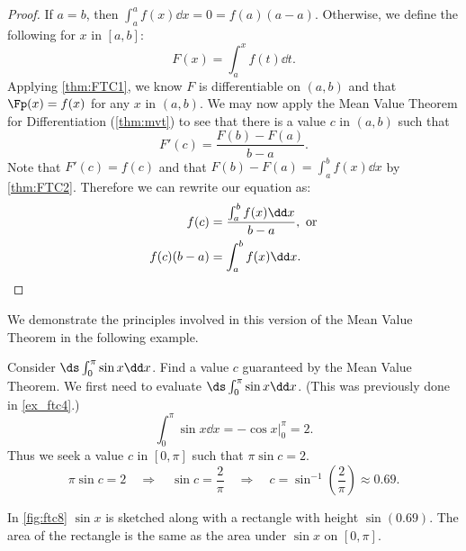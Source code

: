 \begin{proof}
If $a=b$, then $\int_a^a f(x)\dd x =0=f(a)(a-a)$. Otherwise, we define the following for $x$ in $[a,b]$:
\[ F(x)=\int_a^x f(t)\dd t.\]
Applying \autoref{thm:FTC1}, we know $F$ is differentiable on $(a,b)$ and that $\Fp(x)=f(x)$ for any $x$ in $(a,b)$. We may now apply the Mean Value Theorem for Differentiation (\autoref{thm:mvt}) to see that there is a value $c$ in $(a,b)$ such that
\[F'(c)=\frac{F(b)-F(a)}{b-a}.\]
Note that $F'(c)=f(c)$ and that $F(b)-F(a)=\int_a^b f(x)\dd x$ by \autoref{thm:FTC2}. Therefore we can rewrite our equation as: 
\begin{align*}
f(c)&=\frac{\int_a^b f(x)\dd x}{b-a},\text{ or}\\
f(c)(b-a)&=\int_a^b f(x)\dd x.\qedhere
\end{align*}
\end{proof}

We demonstrate the principles involved in this version of the Mean Value Theorem in the following example.


\begin{example}\label{ex_ftc8}%
Consider $\ds\int_0^\pi \sin x\dd x$. Find a value $c$ guaranteed by the Mean Value Theorem.
\solution
We first need to evaluate $\ds\int_0^\pi \sin x\dd x$. (This was previously done in \autoref{ex_ftc4}.)
\[\int_0^\pi\sin x\dd x = -\cos x \Big|_0^\pi = 2.\]
Thus we seek a value $c$ in $[0,\pi]$ such that $\pi\sin c =2$. 
\[
 \pi\sin c = 2\quad \Rightarrow\quad
 \sin c =\frac2\pi\quad \Rightarrow\quad
 c = \sin^{-1}\left(\frac2\pi\right) \approx 0.69.
\]

In \autoref{fig:ftc8} $\sin x$ is sketched along with a rectangle with height $\sin (0.69)$. The area of the rectangle is the same as the area under $\sin x$ on $[0,\pi]$.
\end{example}

